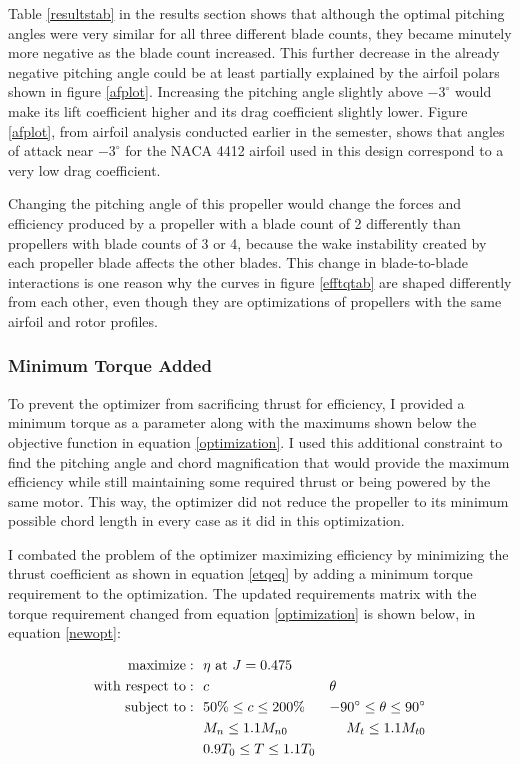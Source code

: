 \documentclass[journal ]{new-aiaa}
\begin{document}
Table \eqref{resultstab} in the results section shows that although the optimal pitching angles were very similar for all three different blade counts, they became minutely more negative as the blade count increased. This further decrease in the already negative pitching angle could be at least partially explained by the airfoil polars shown in figure \eqref{afplot}. Increasing the pitching angle slightly above $-3^{\circ}$ would make its lift coefficient higher and its drag coefficient slightly lower. Figure \eqref{afplot}, from airfoil analysis conducted earlier in the semester, shows that angles of attack near $-3^{\circ}$ for the NACA 4412 airfoil used in this design correspond to a very low drag coefficient.

Changing the pitching angle of this propeller would change the forces and efficiency produced by a propeller with a blade count of 2 differently than propellers with blade counts of 3 or 4, because the wake instability created by each propeller blade affects the other blades\cite{bceff}. This change in blade-to-blade interactions is one reason why the curves in figure \eqref{efftqtab} are shaped differently from each other, even though they are optimizations of propellers with the same airfoil and rotor profiles.

\subsubsection{Minimum Torque Added}

To prevent the optimizer from sacrificing thrust for efficiency, I provided a minimum torque as a parameter along with the maximums shown below the objective function in equation \eqref{optimization}. I used this additional constraint to find the pitching angle and chord magnification that would provide the maximum efficiency while still maintaining some required thrust or being powered by the same motor. This way, the optimizer did not reduce the propeller to its minimum possible chord length in every case as it did in this optimization.

I combated the problem of the optimizer maximizing efficiency by minimizing the thrust coefficient as shown in equation \eqref{etqeq} by adding a minimum torque requirement to the optimization. The updated requirements matrix with the torque requirement changed from equation \eqref{optimization} is shown below, in equation \eqref{newopt}:

\begin{equation}
	\begin{aligned}
		\mathrm{maximize:}& ~~ \eta ~ \text{at} ~ J = 0.475 \\
		\mathrm{with~respect~to:}& ~~ c & \multicolumn{1}{l}{$\theta$} \\
		\mathrm{subject~to:}& ~~ 50\% \leq c \leq 200\% & -90^{\circ} \leq \theta \leq 90^{\circ} \\
		& ~~ M_{n} \leq 1.1 M_{n0} & M_{t} \leq 1.1 M_{t0} \\
		& ~~ 0.9 T_{0} \leq T \leq 1.1 T_{0} \\
	\end{aligned}
	\label{newopt}
\end{equation}
\end{document}
